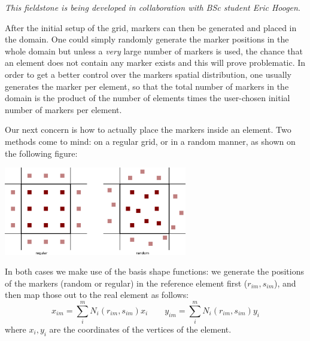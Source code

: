 {\sl This fieldstone is being developed in collaboration with BSc student Eric Hoogen}. 




After the initial setup of the grid, markers can then be generated and placed in the domain. One could simply randomly generate 
the marker positions in the whole domain but unless a {\it very} large number of markers is used, the chance that an element does 
not contain any marker exists and this will prove problematic. In order to get a better control over the markers spatial distribution, 
one usually generates the marker per element, so that the total number of markers in the domain is the product of the number of 
elements times the user-chosen initial number of markers per element. 

Our next concern is how to actually place the markers inside an element. Two methods come to mind: on a regular grid, or in a random manner, 
as shown on the following figure:

\begin{center}
\includegraphics[width=8cm]{python_codes/fieldstone_13/markers} 
\end{center}

In both cases we make use of the basis shape functions: we generate the positions of the markers (random or regular) in the reference
element first ($r_{im},s_{im}$), and then map those out to the real element as follows:
\[
x_{im}=\sum_i^m N_i(r_{im},s_{im}) x_i
\quad\quad
y_{im}=\sum_i^m N_i(r_{im},s_{im}) y_i
\]
where $x_i,y_i$ are the coordinates of the vertices of the element.

